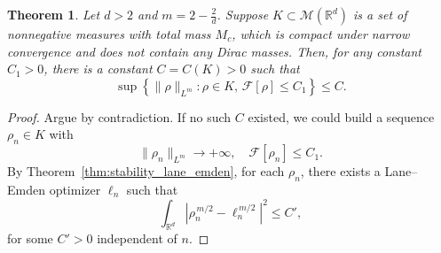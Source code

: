 \documentclass[11pt,a4paper]{article}
\numberwithin{equation}{section}
\newcommand{\R}{{\mathbb{R}}}
\theoremstyle{plain}
\newtheorem{theorem}{Theorem}[section]
\theoremstyle{remark}
\begin{document}
\begin{theorem}\label{thm:new_proof_hls_multid}
Let $d>2$ and $m = 2 - \frac{2}{d}$.  Suppose $K\subset \mathcal{M}(\R^d)$ is a set of nonnegative measures with total mass $M_c$, which is compact under narrow convergence and does not contain any  Dirac masses. Then, for any constant $C_1>0$, there is a constant $C=C(K)>0$ such that
\[
    \sup\left\{\|\rho\|_{L^m} : \rho\in K, \, \mathcal{F}[\rho]\le C_1\right\}  \le  C.
\]
\end{theorem}

\begin{proof}
Argue by contradiction.  If no such $C$ existed, we could build a sequence $\rho_n\in K$ with
\[
\|\rho_n\|_{L^m}  \to  +\infty,
\quad
\mathcal{F}[\rho_n] \le  C_1.
\]
By Theorem~\ref{thm:stability_lane_emden}, for each $\rho_n$, there exists a Lane--Emden optimizer $\ell_n$ such that
\[
\int_{\R^d}\left|\rho_n^{\,m/2} - \ell_n^{\,m/2}\right|^2 \le C',
\]
for some $C'>0$ independent of $n$. 


\end{proof}
\end{document}
